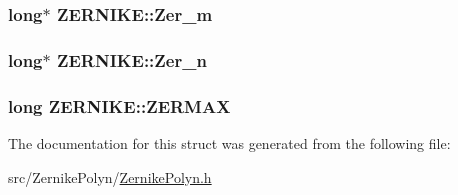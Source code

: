 \subsubsection[{Zer\+\_\+m}]{\setlength{\rightskip}{0pt plus 5cm}long$\ast$ Z\+E\+R\+N\+I\+K\+E\+::\+Zer\+\_\+m}\label{structZERNIKE_a92c691d4081cb095e8f006335bf20f08}
\hypertarget{structZERNIKE_a9c1c566a6926ec5c5458614732c6d358}{}
\subsubsection[{Zer\+\_\+n}]{\setlength{\rightskip}{0pt plus 5cm}long$\ast$ Z\+E\+R\+N\+I\+K\+E\+::\+Zer\+\_\+n}\label{structZERNIKE_a9c1c566a6926ec5c5458614732c6d358}
\hypertarget{structZERNIKE_a2c37fde142f459b1374da2472151ee29}{}
\subsubsection[{Z\+E\+R\+M\+A\+X}]{\setlength{\rightskip}{0pt plus 5cm}long Z\+E\+R\+N\+I\+K\+E\+::\+Z\+E\+R\+M\+A\+X}\label{structZERNIKE_a2c37fde142f459b1374da2472151ee29}


The documentation for this struct was generated from the following file\+:\begin{DoxyCompactItemize}
\item 
src/\+Zernike\+Polyn/\hyperlink{ZernikePolyn_8h}{Zernike\+Polyn.\+h}\end{DoxyCompactItemize}
